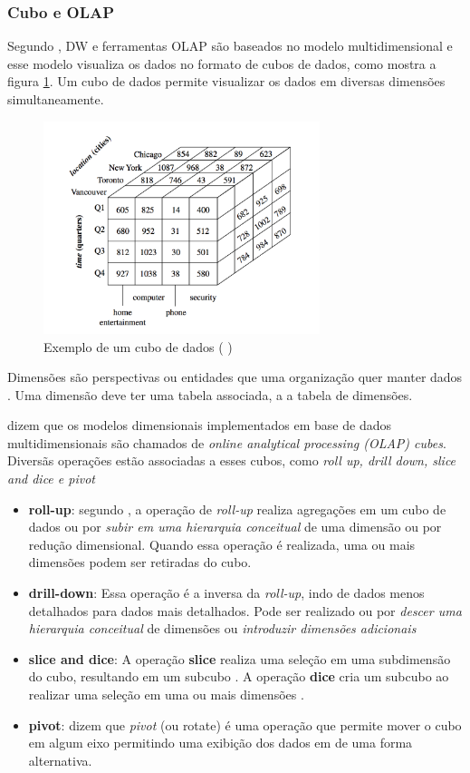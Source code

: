 \subsubsection{Cubo e OLAP}
Segundo , DW e ferramentas OLAP são baseados no modelo multidimensional e esse modelo visualiza os dados no formato de cubos de dados, como mostra a figura \ref{cube}. Um cubo de dados permite visualizar os dados em diversas dimensões simultaneamente.
\begin{figure}[ht]
\centering
\includegraphics[height=6.2cm]{imagens/datacube.png}
\caption{Exemplo de um cubo de dados (\citeauthor{jmj} \citeyear{jmj})}
\label{cube}
\end{figure}
Dimensões são perspectivas ou entidades que uma organização quer manter dados \citep{jmj}. Uma dimensão deve ter uma tabela associada, a a tabela de dimensões.


 dizem que os modelos dimensionais implementados em base de dados multidimensionais são chamados de \textit{online analytical processing (OLAP) cubes}. Diversãs operações estão associadas a esses cubos, como \textit{roll up, drill down, slice and dice e pivot}

\begin{itemize}
    \item \textbf{roll-up}: segundo , a operação de \textit{roll-up} realiza agregações em um cubo de dados ou por \textit{subir em uma hierarquia conceitual} de uma dimensão ou por redução dimensional. Quando essa operação é realizada, uma ou mais dimensões podem ser retiradas do cubo.
    
    \item \textbf{drill-down}: Essa operação é a inversa da \textit{roll-up}, indo de dados menos detalhados para dados mais detalhados. Pode ser realizado ou por \textit{descer uma hierarquia conceitual} de dimensões ou \textit{introduzir dimensões adicionais} \citep{jmj}
    
    \item \textbf{slice and dice}: A operação \textbf{slice} realiza uma seleção em uma subdimensão do cubo, resultando em um subcubo \citep{jmj}. A operação \textbf{dice} cria um subcubo ao realizar uma seleção em uma ou mais dimensões \citep{jmj}.
    
    \item \textbf{pivot}:  dizem que \textit{pivot} (ou rotate) é uma operação que permite mover o cubo em algum eixo permitindo uma exibição dos dados em de uma forma alternativa.
\end{itemize}
